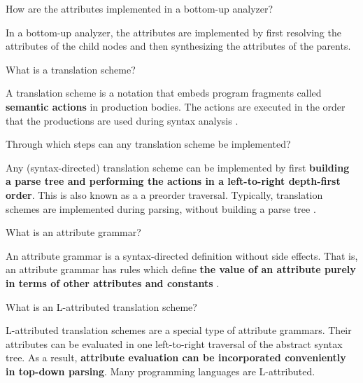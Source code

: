 \begin{Exercise}
How are the attributes implemented in a bottom-up analyzer?
\end{Exercise}
\begin{Answer}
In a bottom-up analyzer, the attributes are implemented by first resolving the attributes of the child nodes and then synthesizing the attributes of the parents.
\end{Answer}

\begin{Exercise}
What is a translation scheme?
\end{Exercise}
\begin{Answer}
A translation scheme is a notation that embeds program fragments called
\textbf{semantic actions} in production bodies.
The actions are executed in the order that the productions are used during syntax analysis \cite[p.~107]{compilers-aho-2007}.
\end{Answer}

\begin{Exercise}
Through which steps can any translation scheme be implemented?
\end{Exercise}
\begin{Answer}
Any (syntax-directed) translation scheme can be implemented by first \textbf{building a parse tree and performing the actions in a left-to-right depth-first order}. This is also known as a a preorder traversal.
Typically, translation schemes are implemented during parsing, without building a parse tree \cite[p.~324]{compilers-aho-2007}.
\end{Answer}

\begin{Exercise}
What is an attribute grammar?
\end{Exercise}
\begin{Answer}
An attribute grammar is a syntax-directed definition without side effects.
That is, an attribute grammar has rules which define \textbf{the value of an attribute purely in terms of other attributes and constants} \cite[p.~306]{compilers-aho-2007}.
\end{Answer}

\begin{Exercise}
What is an L-attributed translation scheme?
\end{Exercise}
\begin{Answer}
L-attributed translation schemes are a special type of attribute grammars.
Their attributes can be evaluated in one left-to-right traversal of the abstract syntax tree.
As a result, \textbf{attribute evaluation can be incorporated conveniently in top-down parsing}.
Many programming languages are L-attributed.
\end{Answer}

